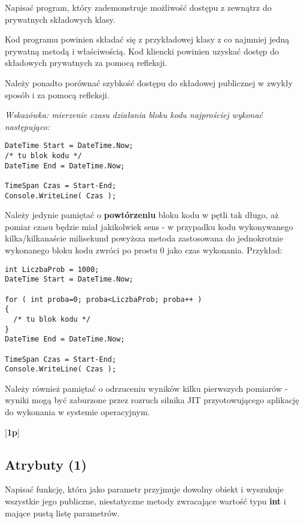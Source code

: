       Napisać program, który zademonstruje możliwość dostępu z zewnątrz
\label{refleksja}	  
      do prywatnych składowych klasy.
      
      Kod programu powinien składać się z przykładowej klasy z co najmniej
      jedną prywatną metodą i właściwością. Kod kliencki powinien uzyskać dostęp
      do składowych prywatnych za pomocą refleksji.
      
      Należy ponadto porównać szybkość dostępu do składowej
      publicznej w zwykły sposób i za pomocą refleksji.
      
      {\em Wskazówka: mierzenie czasu działania bloku kodu najprościej wykonać następująco:
      
      \begin{verbatim}
DateTime Start = DateTime.Now;
/* tu blok kodu */
DateTime End = DateTime.Now;

TimeSpan Czas = Start-End;
Console.WriteLine( Czas );
      \end{verbatim}
      
      Należy jedynie pamiętać o {\bf powtórzeniu} bloku kodu w pętli tak długo, aż pomiar czasu będzie miał jakikolwiek sens - w przypadku kodu wykonywanego
      kilka/kilkanaście milisekund powyższa metoda zastosowana do jednokrotnie wykonanego bloku kodu zwróci po prostu 0 jako czas wykonania. Przykład:

      \begin{verbatim}
int LiczbaProb = 1000;      
DateTime Start = DateTime.Now;

for ( int proba=0; proba<LiczbaProb; proba++ )
{
  /* tu blok kodu */
}
DateTime End = DateTime.Now;

TimeSpan Czas = Start-End;
Console.WriteLine( Czas );
      \end{verbatim}}

Należy również pamiętać o odrzuceniu wyników kilku pierwszych pomiarów - wyniki mogą być zaburzone przez rozruch silnika JIT przyotowującego aplikację do wykonania w systemie operacyjnym.	  
	  
      [{\bf 1p}]

\subsection{Atrybuty (1)}

	Napisać funkcję, która jako parametr przyjmuje dowolny obiekt i wyszukuje wszystkie jego publiczne, niestatyczne metody zwracające
\label{atrybuty}	
    wartość typu {\bf int} i mające pustą listę parametrów.	
	
